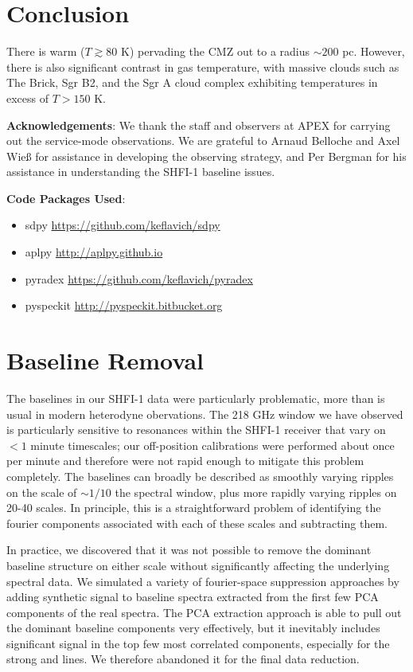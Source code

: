 \section{Conclusion}
There is warm ($T\gtrsim80$ K) pervading the CMZ out to a radius $\sim200$ pc.
However, there is also significant contrast in gas temperature, with massive
clouds such as The Brick, Sgr B2, and the Sgr A cloud complex exhibiting
temperatures in excess of $T>150$ K.

\textbf{Acknowledgements}:
We thank the staff and observers at APEX for carrying out the service-mode
observations.  We are grateful to Arnaud Belloche and Axel Wieß for assistance
in developing the observing strategy, and Per Bergman for his assistance in
understanding the SHFI-1 baseline issues.

\textbf{Code Packages Used}:

\begin{itemize}
    \item sdpy \url{https://github.com/keflavich/sdpy}
    \item aplpy \url{http://aplpy.github.io}
    \item pyradex \url{https://github.com/keflavich/pyradex}
    \item pyspeckit \url{http://pyspeckit.bitbucket.org}
\end{itemize}

\appendix
\section{Baseline Removal}
The baselines in our SHFI-1 data were particularly problematic, more than is
usual in modern heterodyne obervations.  The 218 GHz window we have observed is
particularly sensitive to resonances within the SHFI-1 receiver that vary on
$<1$ minute timescales; our off-position calibrations were performed about once
per minute and therefore were not rapid enough to mitigate this problem
completely.  The baselines can broadly be described as smoothly varying ripples
on the scale of $\sim1/10$ the spectral window, plus more rapidly varying
ripples on 20-40 \kms scales.  In principle, this is a straightforward problem
of identifying the fourier components associated with each of these scales and
subtracting them.

In practice, we discovered that it was not possible to remove the dominant
baseline structure on either scale without significantly affecting the
underlying spectral data.  We simulated a variety of fourier-space suppression
approaches by adding synthetic signal to baseline spectra extracted from the
first few PCA components of the real spectra.
The PCA extraction approach is able to pull out the dominant baseline
components very effectively, but it inevitably includes significant signal in
the top few most correlated components, especially for the strong \formaldehyde
and \thirteenco lines.  We therefore abandoned it for the final data reduction.

